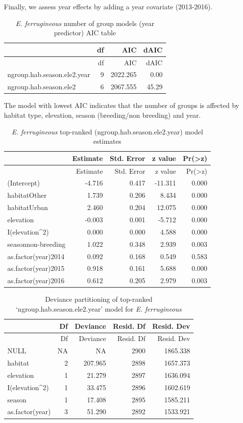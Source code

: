\documentclass[]{article}
\begin{document}
Finally, we assess year effects by adding a year covariate (2013-2016).

\begin{longtable}[]{@{}lrrr@{}}
\caption{\textit{E. ferrugineous} number of group models (year
predictor) AIC table}\tabularnewline
\toprule
& df & AIC & dAIC\tabularnewline
\midrule
\endfirsthead
\toprule
& df & AIC & dAIC\tabularnewline
\midrule
\endhead
ngroup.hab.season.ele2.year & 9 & 2022.265 & 0.00\tabularnewline
ngroup.hab.season.ele2 & 6 & 2067.555 & 45.29\tabularnewline
\bottomrule
\end{longtable}

The model with lowest AIC indicates that the number of groups is
affected by habitat type, elevation, season (breeding/non breeding) and
year.

\begin{longtable}[]{@{}lrrrr@{}}
\caption{\textit{E. ferrugineous} top-ranked
(ngroup.hab.season.ele2.year) model estimates}\tabularnewline
\toprule
& Estimate & Std. Error & z value &
Pr(\textgreater{}\textbar{}z\textbar{})\tabularnewline
\midrule
\endfirsthead
\toprule
& Estimate & Std. Error & z value &
Pr(\textgreater{}\textbar{}z\textbar{})\tabularnewline
\midrule
\endhead
(Intercept) & -4.716 & 0.417 & -11.311 & 0.000\tabularnewline
habitatOther & 1.739 & 0.206 & 8.434 & 0.000\tabularnewline
habitatUrban & 2.460 & 0.204 & 12.075 & 0.000\tabularnewline
elevation & -0.003 & 0.001 & -5.712 & 0.000\tabularnewline
I(elevation\^{}2) & 0.000 & 0.000 & 4.588 & 0.000\tabularnewline
seasonnon-breeding & 1.022 & 0.348 & 2.939 & 0.003\tabularnewline
as.factor(year)2014 & 0.092 & 0.168 & 0.549 & 0.583\tabularnewline
as.factor(year)2015 & 0.918 & 0.161 & 5.688 & 0.000\tabularnewline
as.factor(year)2016 & 0.612 & 0.205 & 2.979 & 0.003\tabularnewline
\bottomrule
\end{longtable}

\begin{longtable}[]{@{}lrrrr@{}}
\caption{Deviance partitioning of top-ranked
`ngroup.hab.season.ele2.year' model for
\textit{E. ferrugineous}}\tabularnewline
\toprule
& Df & Deviance & Resid. Df & Resid. Dev\tabularnewline
\midrule
\endfirsthead
\toprule
& Df & Deviance & Resid. Df & Resid. Dev\tabularnewline
\midrule
\endhead
NULL & NA & NA & 2900 & 1865.338\tabularnewline
habitat & 2 & 207.965 & 2898 & 1657.373\tabularnewline
elevation & 1 & 21.279 & 2897 & 1636.094\tabularnewline
I(elevation\^{}2) & 1 & 33.475 & 2896 & 1602.619\tabularnewline
season & 1 & 17.408 & 2895 & 1585.211\tabularnewline
as.factor(year) & 3 & 51.290 & 2892 & 1533.921\tabularnewline
\bottomrule
\end{longtable}
\end{document}
